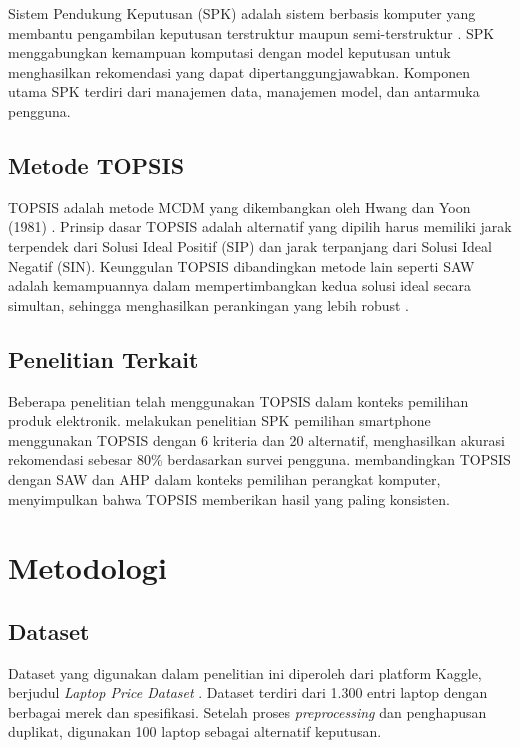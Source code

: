 \documentclass[10pt, a4paper, twocolumn]{article}
\begin{document}
Sistem Pendukung Keputusan (SPK) adalah sistem berbasis komputer yang membantu pengambilan keputusan terstruktur maupun semi-terstruktur \cite{turban2005}. SPK menggabungkan kemampuan komputasi dengan model keputusan untuk menghasilkan rekomendasi yang dapat dipertanggungjawabkan. Komponen utama SPK terdiri dari manajemen data, manajemen model, dan antarmuka pengguna.

\subsection{Metode TOPSIS}

TOPSIS adalah metode MCDM yang dikembangkan oleh Hwang dan Yoon (1981) \cite{hwang1981}. Prinsip dasar TOPSIS adalah alternatif yang dipilih harus memiliki jarak terpendek dari Solusi Ideal Positif (SIP) dan jarak terpanjang dari Solusi Ideal Negatif (SIN). Keunggulan TOPSIS dibandingkan metode lain seperti SAW adalah kemampuannya dalam mempertimbangkan kedua solusi ideal secara simultan, sehingga menghasilkan perankingan yang lebih robust \cite{yoon1995}.

\subsection{Penelitian Terkait}

Beberapa penelitian telah menggunakan TOPSIS dalam konteks pemilihan produk elektronik. \cite{previous2} melakukan penelitian SPK pemilihan smartphone menggunakan TOPSIS dengan 6 kriteria dan 20 alternatif, menghasilkan akurasi rekomendasi sebesar 80\% berdasarkan survei pengguna. \cite{previous3} membandingkan TOPSIS dengan SAW dan AHP dalam konteks pemilihan perangkat komputer, menyimpulkan bahwa TOPSIS memberikan hasil yang paling konsisten.

\section{Metodologi}

\subsection{Dataset}

Dataset yang digunakan dalam penelitian ini diperoleh dari platform Kaggle, berjudul \textit{Laptop Price Dataset} \cite{kaggle2023}. Dataset terdiri dari 1.300 entri laptop dengan berbagai merek dan spesifikasi. Setelah proses \textit{preprocessing} dan penghapusan duplikat, digunakan 100 laptop sebagai alternatif keputusan.
\end{document}
